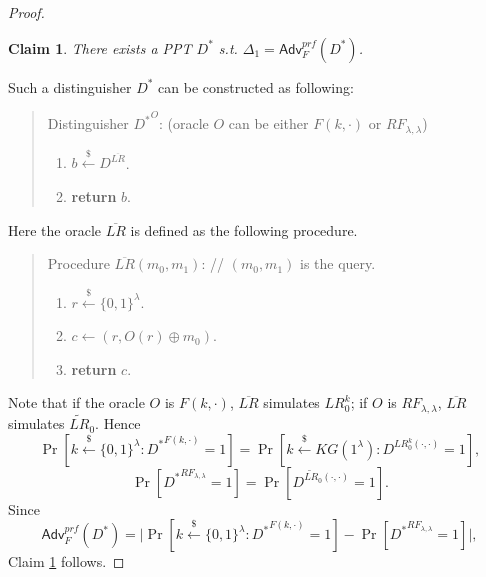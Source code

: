 \documentclass[12pt]{article}
\newcommand{\bits}{\{0,1\}}
\newcommand{\getsr}{\stackrel{\$}{\gets}}
\newcommand{\Adv}{\mathsf{Adv}}
\newtheorem{claim}[theorem]{Claim}
\theoremstyle{definition}
\begin{document}
\begin{proof}
\begin{claim}
\label{clm:d1}
There exists a PPT $D^*$ s.t. $\Delta_1 = \Adv_{F}^{prf}(D^*)$.
\end{claim}
Such a distinguisher $D^*$ can be constructed as following:
\begin{quote}
Distinguisher ${D^*}^O$: (oracle $O$ can be either $F(k,\cdot)$ or $RF_{\lambda,\lambda}$)
\begin{enumerate}
\item $b \getsr D^{\overline{LR}}$.
\item {\bf return} $b$.
\end{enumerate}
\end{quote}
Here the oracle $\overline{LR}$ is defined as the following procedure.
\begin{quote}
Procedure $\overline{LR} (m_0, m_1)$: // $(m_0, m_1)$ is the query.
\begin{enumerate}
\item $r \getsr \bits^\lambda$.
\item $c \gets (r, O(r) \oplus m_0)$.
\item {\bf return} $c$.
\end{enumerate}
\end{quote}
Note that if the oracle $O$ is $F(k,\cdot)$, $\overline{LR}$ simulates $LR_0^k$; if $O$ is $RF_{\lambda,\lambda}$, $\overline{LR}$ simulates $\widetilde{LR}_0$. Hence
$$\Pr[k \getsr \bits^\lambda : {D^*}^{F(k, \cdot)} = 1] = \Pr[k \getsr KG(1^\lambda) : D^{LR_0^k(\cdot,\cdot)} = 1],$$
$$\Pr[{D^*}^{RF_{\lambda,\lambda}} = 1] = \Pr[D^{\widetilde{LR}_0(\cdot,\cdot)} = 1].$$
Since
$$\Adv_{F}^{prf}(D^*) = \bigg|\Pr[k \getsr \bits^\lambda : {D^*}^{F(k, \cdot)} = 1] - \Pr[{D^*}^{RF_{\lambda,\lambda}} = 1]\bigg|,$$
Claim \ref{clm:d1} follows.


\end{proof}
\end{document}
